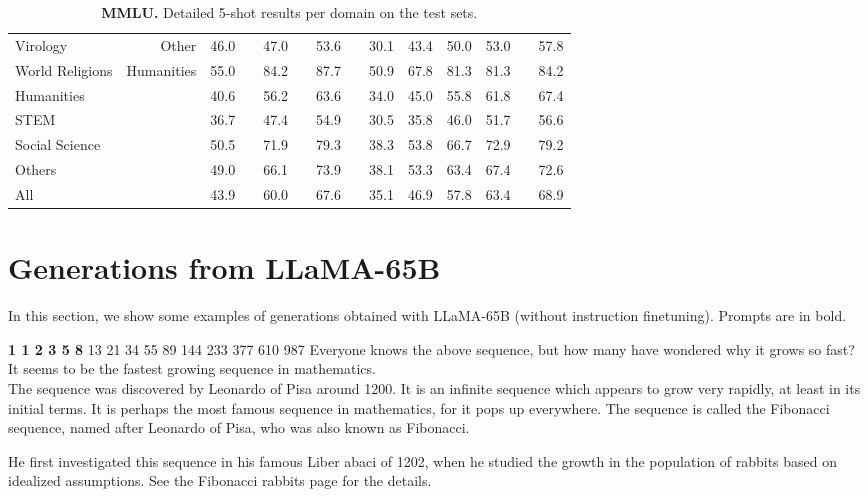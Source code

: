 \documentclass[11pt]{article}
\newcommand{\model}{LLaMA\xspace}%
\begin{document}
\begin{table}
{\begin{tabular}{@{}lr cc cc cc cccc c c@{}}
Virology & Other & 46.0 && 47.0 && 53.6 && 30.1 & 43.4 & 50.0 & 53.0 && 57.8  \\
World Religions & Humanities & 55.0 && 84.2 && 87.7 && 50.9 & 67.8 & 81.3 & 81.3 && 84.2  \\ \midrule
Humanities & & 40.6 && 56.2 && 63.6 && 34.0 & 45.0 & 55.8 & 61.8 && 67.4 \\
STEM & & 36.7 &&  47.4 && 54.9 && 30.5 & 35.8 & 46.0 & 51.7 && 56.6 \\
Social Science & & 50.5 && 71.9 && 79.3 && 38.3 & 53.8	 & 66.7 & 72.9 && 79.2  \\
Others & & 49.0 && 66.1 && 73.9 && 38.1 & 53.3 & 63.4 & 67.4 && 72.6 \\ \midrule
All & & 43.9 && 60.0 && 67.6 && 35.1 & 46.9 & 57.8 & 63.4 && 68.9 \\
    \bottomrule
  \end{tabular}}
  \caption{
    \textbf{MMLU.} Detailed 5-shot results per domain on the test sets.
    \label{tab:mmluapp}
  }
\end{table}



\clearpage

\section{Generations from \model-65B}
In this section, we show some examples of generations obtained with \model-65B (without instruction finetuning). Prompts are in bold.



\begin{framed}
\centering
\vspace{.5em}
 \begin{minipage}{.9\textwidth}
\textbf{1 1 2 3 5 8} 13 21 34 55 89 144 233 377 610 987
Everyone knows the above sequence, but how many have wondered why it grows so fast?
It seems to be the fastest growing sequence in mathematics.\\

The sequence was discovered by Leonardo of Pisa around 1200.
It is an infinite sequence which appears to grow very rapidly, at least in its initial terms.
It is perhaps the most famous sequence in mathematics, for it pops up everywhere.
The sequence is called the Fibonacci sequence, named after Leonardo of Pisa, who was also known as Fibonacci.

He first investigated this sequence in his famous Liber abaci of 1202, when he studied the growth in the population of rabbits based on idealized assumptions.
See the Fibonacci rabbits page for the details.

\end{minipage}
\vspace{.5em}
\end{framed}
\end{document}
